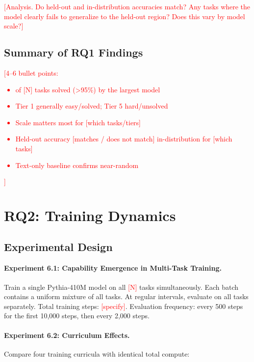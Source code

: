 \documentclass[11pt]{article}
\newcommand{\placeholder}[1]{\textcolor{red}{[#1]}}
\begin{document}
\placeholder{Analysis. Do held-out and in-distribution accuracies match? Any tasks where the model clearly fails to generalize to the held-out region? Does this vary by model scale?}


\subsection{Summary of RQ1 Findings}

\placeholder{4--6 bullet points:
\begin{itemize}
\item [X] of [N] tasks solved (>95\%) by the largest model
\item Tier 1 generally easy/solved; Tier 5 hard/unsolved
\item Scale matters most for [which tasks/tiers]
\item Held-out accuracy [matches / does not match] in-distribution for [which tasks]
\item Text-only baseline confirms near-random
\end{itemize}
}


\section{RQ2: Training Dynamics}
\label{sec:rq2}

\subsection{Experimental Design}

\paragraph{Experiment 6.1: Capability Emergence in Multi-Task Training.}
Train a single Pythia-410M model on all \placeholder{N} tasks simultaneously. Each batch contains a uniform mixture of all tasks. At regular intervals, evaluate on all tasks separately.
Total training steps: \placeholder{specify}.
Evaluation frequency: every 500 steps for the first 10{,}000 steps, then every 2{,}000 steps.

\paragraph{Experiment 6.2: Curriculum Effects.}
Compare four training curricula with identical total compute:
\end{document}
